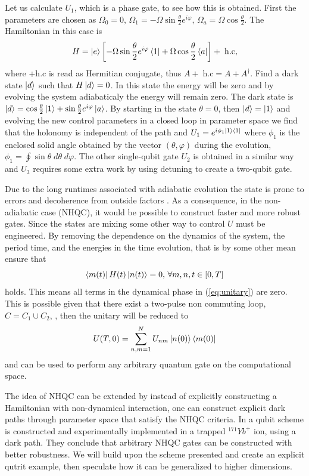 Let us calculate $U_1$, which is a phase gate, to see how this is obtained. First the parameters are chosen as $\Omega_0 = 0,\,\Omega_1 = -\Omega\sin\frac{\theta}{2}e^{i\varphi},\, \Omega_a = \Omega\cos\frac{\theta}{2}$. The Hamiltonian in this case is 
\begin{equation}
H  = \ket{e}\left[-\Omega\sin\frac{\theta}{2}e^{i\varphi}\bra{1} + \Omega\cos\frac{\theta}{2}\bra{a}\right] + \;\text{h.c},
\end{equation}
where +\;h.c is read as Hermitian conjugate, thus $A +\;\text{h.c} = A + A^\dagger$.
Find a dark state $\ket{d}$ such that $H\ket{d} = 0$. In this state the energy will be zero and by evolving the system adiabaticaly the energy will remain zero. The dark state is $\ket{d} = \cos\frac{\theta}{2}\ket{1} + \sin\frac{\theta}{2}e^{i\varphi}\ket{a}$. By starting in the state $\theta = 0$, then $\ket{d} = \ket{1}$ and evolving the new control parameters in a closed loop in parameter space we find that the holonomy is independent of the path and $U_1 = e^{i\phi_1\ket{1}\bra{1}}$ where $\phi_1$ is the enclosed solid angle obtained by the vector $(\theta,\varphi)$ during the evolution, $\phi_1 = \oint \sin\theta\; d\theta \;d\varphi$. The other single-qubit gate $U_2$ is obtained in a similar way and $U_3$ requires some extra work by using detuning to create a two-qubit gate.



Due to the long runtimes associated with adiabatic evolution the state is prone to errors and decoherence from outside factors \cite{NHQC}. As a consequence, in the non-adiabatic case (NHQC), it would be possible to construct faster and more robust gates. Since the states are mixing some other way to control $U$ must be engineered. By removing the dependence on the dynamics of the system, the period time, and the energies in the time evolution, that is by some other mean ensure that 
\begin{equation}
\bra{m(t)}H(t)\ket{n(t)} = 0,\,\forall m,n, t\in[0,T]
\end{equation} 
holds. This means all terms in the dynamical phase in (\ref{eq:unitary}) are zero.
This is possible given that there exist a two-pulse non commuting loop, $C = C_1 \cup C_2$, \cite{NHQC,sLoop}, 
then the unitary will be reduced to 
\begin{equation}
U(T,0) = \sum_{n,m = 1}^{N} U_{nm}\ket{n(0)}\bra{m(0)}
\end{equation}
and can be used to perform any arbitrary quantum gate on the computational space.

The idea of NHQC can be extended by instead of explicitly constructing a Hamiltonian with non-dynamical interaction, one can construct explicit dark paths through parameter space that satisfy the NHQC criteria. In \cite{darkpath} a qubit scheme is constructed and experimentally implemented in a trapped $^{171}Yb^{+}$ ion, using a dark path. They conclude that arbitrary NHQC gates can be constructed with better robustness. We will build upon the scheme presented and create an explicit qutrit example, then speculate how it can be generalized to higher dimensions.

